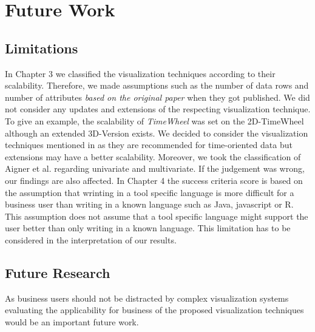 \chapter{Future Work}
\label{Future Work}

\section{Limitations}
In Chapter 3 we classified the visualization techniques according to their scalability. Therefore, we made assumptions such as the number of data rows and number of attributes \textit{based on the original paper} when they got published. We did not consider any updates and extensions of the respecting visualization technique. To give an example, the scalability of \textit{TimeWheel} was set on the 2D-TimeWheel although an extended 3D-Version exists. We decided to consider the visualization techniques mentioned in\cite{Aigner2011} as they are recommended for time-oriented data but extensions may have a better scalability.  
Moreover, we took the classification of Aigner et al.\cite{Aigner2011} regarding univariate and multivariate. If the judgement was wrong, our findings are also affected.
In Chapter 4 the success criteria score is based on the assumption that wrinting in a tool specific language is more difficult for a business user than writing in a known language such as Java, javascript or R. This assumption does not assume that a tool specific language might support the user better than only writing in a known language. This limitation has to be considered in the interpretation of our results.
\section{Future Research}


As business users should not be distracted by complex visualization systems \cite{Tegarden1999} evaluating the applicability for business of the proposed visualization techniques would be an important future work.
